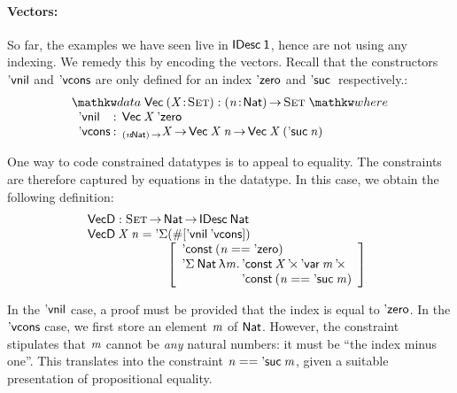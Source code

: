 \paragraph{Vectors:}

\newcommand{\VecD}{\F{VecD}}
\newcommand{\VecNil}{\etag{\CN{vnil}}}
\newcommand{\SYMBVecCons}{\etag{\CN{vcons}}\xspace}
\newcommand{\VecCons}[2]{\SYMBVecCons\:#1\:#2}

So far, the examples we have seen live in $\IDesc{\Unit}$, hence are
not using any indexing. We remedy this by encoding the vectors. Recall
that the constructors $\VecNil$ and $\SYMBVecCons$ are only defined for an
index $\NatZero$ and $\NatSuc$ respectively.:
%
\[
\stk{
\data \D{Vec}\: \PITEL{\V{X}}{\Set} : \PI{\V{n}}{\Nat} \Set \where \\
\;\;\begin{array}{@{}l@{\::\:\:}l@{\quad}l}
    \VecNil          & \D{Vec}\:\V{X}\:{\NatZero}   \\
    \SYMBVecCons & _{\PI{\V{n}}{\Nat}}\V{X} \To \D{Vec}\:{\V{X}}\:{\V{n}} \To \D{Vec}\:{\V{X}}\:{(\NatSuc{\V{n}})}
\end{array}
}
\]

One way to code constrained datatypes is to appeal to equality. The
constraints are therefore captured by equations in the datatype. In
this case, we obtain the following definition:
%
\[\stk{
\VecD : \Set \To \Nat \To \IDesc{\Nat} \\
\begin{array}{@{}l@{}l}
\VecD\: \V{X}\: \V{n} = \SYMBDSigma & (\EnumT{\sqr{ \VecNil\:\SYMBVecCons }}) \\
                        & \bigRedBracket{
                          \begin{array}{l}
                            \DConst{(\V{n} \PropEq \NatZero)} \\
                            \DSigma{\Nat}{\LAM{\V{m}}
\stk{\DProd{\DConst{\V{X}}}{\DProd{\DVar{\V{m}}}{\\\DConst{(\V{n} \PropEq \NatSuc{\V{m}})}}}}}
                          \end{array}
                          }
\end{array}
}\]

In the $\VecNil$ case, a proof must be provided that the index is
equal to $\NatZero$. In the $\SYMBVecCons$ case, we first store an element
$\V{m}$ of $\Nat$. However, the constraint stipulates that $\V{m}$
cannot be \emph{any} natural numbers: it must be ``the index minus
one''. This translates into the constraint $\V{n} \PropEq
\NatSuc{\V{m}}$, given a suitable presentation of propositional equality.

